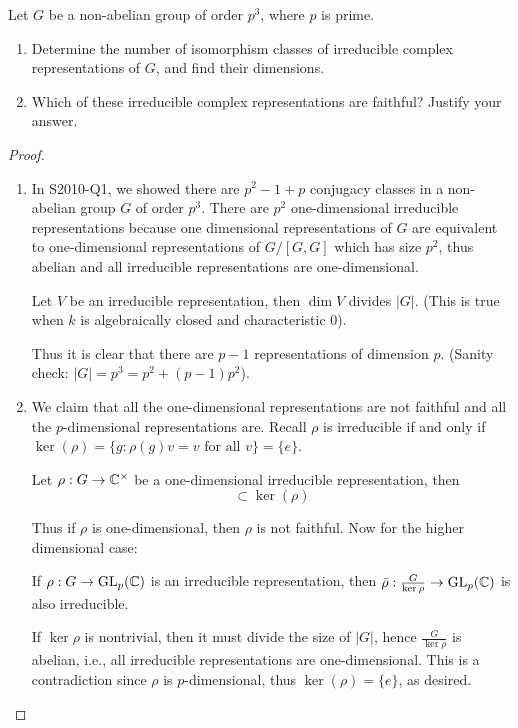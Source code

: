 \begin{prob}[F2010-Q6]
    Let \( G \) be a non-abelian group of order \( p^3 \), where \( p \) is prime.
    
    \begin{enumerate}
        \item Determine the number of isomorphism classes of irreducible complex representations of \( G \), and find their dimensions.
        
        \item Which of these irreducible complex representations are faithful? Justify your answer.
    \end{enumerate}
\end{prob}
\begin{proof}
    \begin{enumerate}
        \item In S2010-Q1, we showed there are $p^2-1+p$ conjugacy classes in a non-abelian group $G$ of order $p^3$. There are $p^2$ one-dimensional irreducible representations because one dimensional representations of $G$ are equivalent to one-dimensional representations of $G/[G,G]$ which has size $p^2$, thus abelian and all irreducible representations are one-dimensional. 
        \begin{lem}[Fact]
            Let $V$ be an irreducible representation, then $\dim V$ divides $|G|$. (This is true when $k$ is algebraically closed and characteristic $0$).
        \end{lem}
        Thus it is clear that there are $p-1$ representations of dimension $p$. (Sanity check: $|G|=p^3=p^2+(p-1)p^2$).
        \item We claim that all the one-dimensional representations are not faithful and all the $p$-dimensional representations are. Recall $\rho$ is irreducible if and only if $\ker(\rho)=\{g: \rho(g)v=v \text{ for all }v\}=\{e\}$.
        \begin{lem}[Fact]
            Let $\rho:G\to\mathbb{C}^\times$ be a one-dimensional irreducible representation, then
            \begin{equation*}
                [G,G]\subset\ker(\rho)
            \end{equation*}
        \end{lem}
        Thus if $\rho$ is one-dimensional, then $\rho$ is not faithful. Now for the higher dimensional case:
        \begin{lem}[Fact]
            If $\rho: G\to\text{GL}_p(\mathbb{C})$ is an irreducible representation, then $\bar{\rho}: \frac{G}{\ker\rho}\to\text{GL}_p(\mathbb{C})$ is also irreducible.
        \end{lem}
        If $\ker\rho$ is nontrivial, then it must divide the size of $|G|$, hence $\frac{G}{\ker\rho}$ is abelian, i.e., all irreducible representations are one-dimensional. This is a contradiction since $\rho$ is $p$-dimensional, thus $\ker(\rho)=\{e\}$, as desired.
    \end{enumerate}
\end{proof}


